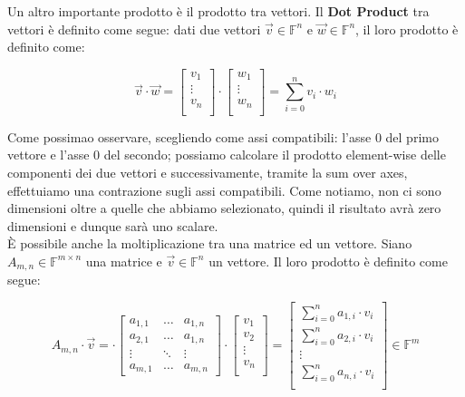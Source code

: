 Un altro importante prodotto è il prodotto tra vettori. Il \textbf{Dot Product} tra vettori è definito come segue: dati due vettori $\vec v \in  \mathbb{F}^n$ e $\vec w \in \mathbb{F}^n$, il loro prodotto è definito come:

$$
\vec v \cdot \vec w = \begin{bmatrix}
        v_1\\
        \vdots \\
        v_n \\
\end{bmatrix}
    \cdot 
\begin{bmatrix}
        w_1\\
        \vdots \\
        w_n\\
\end{bmatrix} = \sum_{i=0}^n v_i \cdot w_i
$$

Come possimao osservare, scegliendo come assi compatibili: l'asse 0 del primo vettore e l'asse 0 del secondo; possiamo calcolare il prodotto element-wise delle componenti dei due vettori e successivamente, tramite la sum over axes, effettuiamo una contrazione sugli assi compatibili. Come notiamo, non ci sono dimensioni oltre a quelle che abbiamo selezionato, quindi il risultato avrà zero dimensioni e dunque sarà uno scalare.
\\

\`E possibile anche la moltiplicazione tra una matrice ed un vettore. Siano $A_{m,n} \in \mathbb F^{m \times n}$ una matrice e $\vec v \in \mathbb{F}^n$ un vettore. Il loro prodotto è definito come segue:

$$
A_{m,n} \cdot \vec v = \cdot \begin{bmatrix}
    a_{1,1} & \dots & a_{1,n}\\
    a_{2,1} & \dots & a_{1,n}\\
    \vdots  & \ddots & \vdots \\
    a_{m,1} & \dots & a_{m,n}
\end{bmatrix} \cdot \begin{bmatrix}
        v_1\\
        v_2\\
        \vdots \\
        v_n \\
\end{bmatrix} = \begin{bmatrix}
        \sum_{i=0}^n a_{1,i} \cdot v_i\\
        \sum_{i=0}^n a_{2,i} \cdot v_i\\
        \vdots \\
        \sum_{i=0}^n a_{n,i} \cdot v_i \\
\end{bmatrix} \in \mathbb F^{m}
$$

